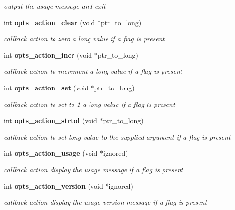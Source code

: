 \begin{CompactItemize}
\begin{CompactList}\small\item\em output the usage message and exit\item\end{CompactList}\item 
int {\bf opts\_\-action\_\-clear} (void $\ast$ptr\_\-to\_\-long)
\begin{CompactList}\small\item\em callback action to zero a long value if a flag is present\item\end{CompactList}\item 
int {\bf opts\_\-action\_\-incr} (void $\ast$ptr\_\-to\_\-long)
\begin{CompactList}\small\item\em callback action to increment a long value if a flag is present\item\end{CompactList}\item 
int {\bf opts\_\-action\_\-set} (void $\ast$ptr\_\-to\_\-long)
\begin{CompactList}\small\item\em callback action to set to 1 a long value if a flag is present\item\end{CompactList}\item 
int {\bf opts\_\-action\_\-strtol} (void $\ast$ptr\_\-to\_\-long)
\begin{CompactList}\small\item\em callback action to set long value to the supplied argument if a flag is present\item\end{CompactList}\item 
int {\bf opts\_\-action\_\-usage} (void $\ast$ignored)
\begin{CompactList}\small\item\em callback action display the usage message if a flag is present\item\end{CompactList}\item 
int {\bf opts\_\-action\_\-version} (void $\ast$ignored)
\begin{CompactList}\small\item\em callback action display the usage version message if a flag is present\item\end{CompactList}\end{CompactItemize}


